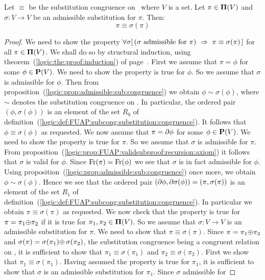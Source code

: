 \begin{prop}\label{logic:prop:FUAP:subcong:admissible:subcong}
Let $\equiv$ be the substitution congruence on \pvs\ where $V$ is a
set. Let $\pi\in\mbox{${\bf\Pi}(V)$}$ and $\sigma:V\to V$ be an admissible
substitution for $\pi$. Then:
    \[
    \pi\equiv\sigma(\pi)
    \]
\end{prop}
\begin{proof}
We need to show the property $\forall\sigma[\,(\sigma\mbox{\
admissible for\ }\pi)\ \Rightarrow\ \pi\equiv\sigma(\pi)\,]$ for all
$\pi\in\mbox{${\bf\Pi}(V)$}$. We shall do so by structural induction, using
theorem~(\ref{logic:the:proof:induction}) of
page~\pageref{logic:the:proof:induction}. First we assume that
$\pi=\phi$ for some $\phi\in\mbox{${\bf P}(V)$}$. We need to show the property is
true for $\phi$. So we assume that $\sigma$ is admissible for
$\phi$. Then from
proposition~(\ref{logic:prop:admissible:sub:congruence}) we obtain
$\phi\sim\sigma(\phi)$, where $\sim$ denotes the substitution
congruence on \pv. In particular, the ordered pair
$(\phi,\sigma(\phi))$ is an element of the set $R_{0}$ of
definition~(\ref{logic:def:FUAP:subcong:substitution:congruence}).
It follows that $\phi\equiv\sigma(\phi)$ as requested. We now assume
that $\pi=\mbox{$\partial$}\phi$ for some $\phi\in\mbox{${\bf P}(V)$}$. We need to show the
property is true for $\pi$. So we assume that $\sigma$ is admissible
for $\pi$. From
proposition~(\ref{logic:prop:FUAP:validsubproof:recursion:axiom}) it
follows that $\sigma$ is valid for $\phi$. Since
$\mbox{\rm Fr}(\pi)=\mbox{\rm Fr}(\phi)$ we see that $\sigma$ is in fact admissible
for $\phi$. Using
proposition~(\ref{logic:prop:admissible:sub:congruence}) once more,
we obtain $\phi\sim\sigma(\phi)$. Hence we see that the ordered pair
$(\mbox{$\partial$}\phi,\mbox{$\partial$}\sigma(\phi))=(\pi,\sigma(\pi))$ is an element of the
set $R_{1}$ of
definition~(\ref{logic:def:FUAP:subcong:substitution:congruence}).
In particular we obtain $\pi\equiv\sigma(\pi)$ as requested. We now
check that the property is true for $\pi=\pi_{1}\mbox{$\oplus$}\pi_{2}$ if it
is true for $\pi_{1},\pi_{2}\in\mbox{${\bf\Pi}(V)$}$. So we assume that $\sigma:V\to
V$ is an admissible substitution for $\pi$. We need to show that
$\pi\equiv\sigma(\pi)$. Since $\pi=\pi_{1}\mbox{$\oplus$}\pi_{2}$ and
$\sigma(\pi)=\sigma(\pi_{1})\mbox{$\oplus$}\,\sigma(\pi_{2})$, the substitution
congruence being a congruent relation on \pvs, it is sufficient to
show that $\pi_{1}\equiv\sigma(\pi_{1})$ and
$\pi_{2}\equiv\sigma(\pi_{2})$. First we show that
$\pi_{1}\equiv\sigma(\pi_{1})$. Having assumed the property is true
for $\pi_{1}$, it is sufficient to show that $\sigma$ is an
admissible substitution for $\pi_{1}$. Since $\sigma$ admissible for

\end{proof}
